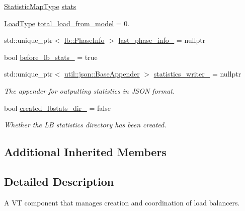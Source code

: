 \begin{DoxyCompactItemize}
\item 
\hyperlink{structvt_1_1vrt_1_1collection_1_1balance_1_1_l_b_manager_a3c6941b9c14a77e015047c659b817a85}{Statistic\+Map\+Type} \hyperlink{structvt_1_1vrt_1_1collection_1_1balance_1_1_l_b_manager_a1cd6e1eace2e827d04679d2a923d7325}{stats}
\item 
\hyperlink{namespacevt_a8fb51741340b87d7aaee0bef60e9896b}{Load\+Type} \hyperlink{structvt_1_1vrt_1_1collection_1_1balance_1_1_l_b_manager_addc8a1fe654a96e4597f596b0debb9d5}{total\+\_\+load\+\_\+from\+\_\+model} = 0.
\item 
std\+::unique\+\_\+ptr$<$ \hyperlink{structvt_1_1vrt_1_1collection_1_1lb_1_1_phase_info}{lb\+::\+Phase\+Info} $>$ \hyperlink{structvt_1_1vrt_1_1collection_1_1balance_1_1_l_b_manager_ac079e6cb56fedab15d6a776f89cb8e44}{last\+\_\+phase\+\_\+info\+\_\+} = nullptr
\item 
bool \hyperlink{structvt_1_1vrt_1_1collection_1_1balance_1_1_l_b_manager_ad5f6e3a90a443d75ad9df0264d3e9d83}{before\+\_\+lb\+\_\+stats\+\_\+} = true
\item 
std\+::unique\+\_\+ptr$<$ \hyperlink{structvt_1_1util_1_1json_1_1_base_appender}{util\+::json\+::\+Base\+Appender} $>$ \hyperlink{structvt_1_1vrt_1_1collection_1_1balance_1_1_l_b_manager_a6a5c0370df20ab5adb200fb766b03776}{statistics\+\_\+writer\+\_\+} = nullptr
\begin{DoxyCompactList}\small\item\em The appender for outputting statistics in J\+S\+ON format. \end{DoxyCompactList}\item 
bool \hyperlink{structvt_1_1vrt_1_1collection_1_1balance_1_1_l_b_manager_a87cf4beb67cee5dfe49366ce2387cf06}{created\+\_\+lbstats\+\_\+dir\+\_\+} = false
\begin{DoxyCompactList}\small\item\em Whether the LB statistics directory has been created. \end{DoxyCompactList}\end{DoxyCompactItemize}
\subsection*{Additional Inherited Members}


\subsection{Detailed Description}
A VT component that manages creation and coordination of load balancers. 

